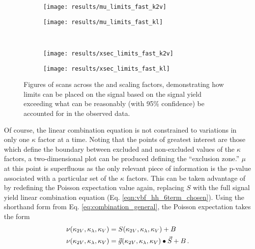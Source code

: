     \begin{figure}[!htbp]
        \centering
        \begin{subfigure}{0.48\textwidth} 
            \texttt{[image: results/mu\_limits\_fast\_k2v]}
            \caption{}%
            \label{fig:mulimits_kvv}
        \end{subfigure}
        \begin{subfigure}{0.48\textwidth}
            \texttt{[image: results/mu\_limits\_fast\_kl]}
            \caption{}%
            \label{fig:mulimits_kl}
        \end{subfigure}\\
        \begin{subfigure}{0.48\textwidth} 
            \texttt{[image: results/xsec\_limits\_fast\_k2v]}
            \caption{}%
            \label{fig:xseclimits_kvv}
        \end{subfigure}
        \begin{subfigure}{0.48\textwidth}
            \texttt{[image: results/xsec\_limits\_fast\_kl]}
            \caption{}%
            \label{fig:xseclimits_kl}
        \end{subfigure}
        \caption{
            Figures of scans across the \kvv and \kl scaling factors,
                demonstrating how limits can be placed on the signal based on
                the signal yield exceeding what can be reasonably (with 95\% confidence)
                be accounted for in the observed data.
        }
    \end{figure}

    Of course, the linear combination equation is not constrained to variations in only one $\kappa$ factor at a time.
    Noting that the points of greatest interest are those which define the boundary between excluded and non-excluded
        values of the $\kappa$ factors, a two-dimensional plot can be produced defining the ``exclusion zone.''
    $\mu$ at this point is superfluous as the only relevant piece of information is the p-value
        associated with a particular set of the $\kappa$ factors.
    This can be taken advantage of by redefining the Poisson expectation value again,
        replacing $S$ with the full signal yield linear combination equation (Eq. \ref{eqn:vbf_hh_6term_chosen}).
    Using the shorthand form from Eq. \ref{eq:combination_general}, the Poisson expectation takes the form
    \begin{equation} \begin{split}
        \nu(\kappa_{2V},\kappa_{\lambda},\kappa_{V}) &= S(\kappa_{2V},\kappa_{\lambda},\kappa_{V}) + B \\
        \nu(\kappa_{2V},\kappa_{\lambda},\kappa_{V}) &= \vec{g}(\kappa_{2V},\kappa_{\lambda},\kappa_{V}) \bullet \vec{S} + B
        \,.
    \end{split} \end{equation}

